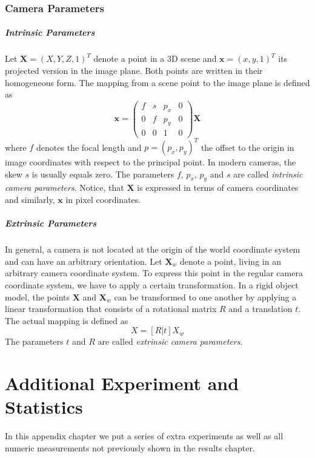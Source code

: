 \subsection{Camera Parameters}
\paragraph{Intrinsic Parameters} Let $\textbf{X} = (X,Y,Z,1)^T$ denote a point in a 3D scene and $\textbf{x} = (x,y,1)^T$ its projected version in the image plane. Both points are written in their homogeneous form. The mapping from a scene point to the image plane is defined as
\begin{equation}
\textbf{x} = 
\begin{pmatrix}
f & s & p_x & 0 \\
0 & f & p_y & 0 \\
0 & 0 & 1 & 0
\end{pmatrix}
\textbf{X}
\end{equation}
where $f$ denotes the focal length and $p = (p_x, p_y)^T$ the offset to the origin in image coordinates with respect to the principal point. In modern cameras, the skew $s$ is usually equals zero. The parameters $f$, $p_x$, $p_y$ and $s$ are called \textit{intrinsic camera parameters}. Notice, that $\textbf{X}$ is expressed in terms of camera coordinates and similarly, $\textbf{x}$ in pixel coordinates.

\paragraph{Extrinsic Parameters} In general, a camera is not located at the origin of the world coordinate system and can have an arbitrary orientation. Let $\textbf{X}_w$ denote a point, living in an arbitrary camera coordinate system. To express this point in the regular camera coordinate system, we have to apply a certain transformation. In a rigid object model, the points $\textbf{X}$ and $\textbf{X}_w$ can be transformed to one another by applying a linear transformation that consists of a rotational matrix $R$ and a translation $t$. The actual mapping is defined as
\begin{equation}
	X = \left[ R | t \right] X_w
\end{equation}
The parameters $t$ and $R$ are called \textit{extrinsic camera parameters}.


\chapter{Additional Experiment and Statistics}
In this appendix chapter we put a series of extra experiments as well as all numeric measurements not previously shown in the results chapter.

